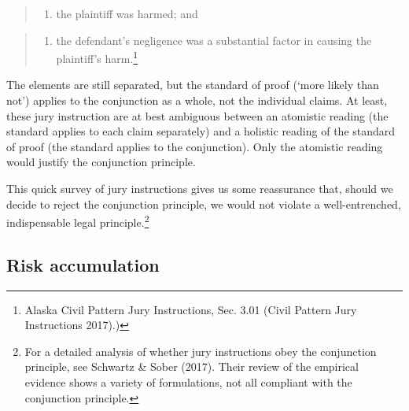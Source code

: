 \documentclass[
  10pt,
  dvipsnames,enabledeprecatedfontcommands]{scrartcl}
\providecommand{\tightlist}{%
  \setlength{\itemsep}{0pt}\setlength{\parskip}{0pt}}
\begin{document}
\begin{quote}
\begin{enumerate}
\def\labelenumi{\arabic{enumi}.}
\setcounter{enumi}{1}
\tightlist
\item
  the plaintiff was harmed; and
\end{enumerate}
\end{quote}

\begin{quote}
\begin{enumerate}
\def\labelenumi{\arabic{enumi}.}
\setcounter{enumi}{2}
\tightlist
\item
  the defendant's negligence was a substantial factor in causing the
  plaintiff's harm.\footnote{Alaska Civil Pattern Jury Instructions,
    Sec. 3.01 (Civil Pattern Jury Instructions 2017).)}
\end{enumerate}
\end{quote}

\noindent The elements are still separated, but the standard of proof
(`more likely than not') applies to the conjunction as a whole, not the
individual claims. At least, these jury instruction are at best
ambiguous between an atomistic reading (the standard applies to each
claim separately) and a holistic reading of the standard of proof (the
standard applies to the conjunction). Only the atomistic reading would
justify the conjunction principle.

This quick survey of jury instructions gives us some reassurance that,
should we decide to reject the conjunction principle, we would not
violate a well-entrenched, indispensable legal principle.\footnote{For a
  detailed analysis of whether jury instructions obey the conjunction
  principle, see Schwartz \& Sober (2017). Their review of the empirical
  evidence shows a variety of formulations, not all compliant with the
  conjunction principle.}

\hypertarget{risk-accumulation}{%
\subsection{Risk accumulation}\label{risk-accumulation}}
\end{document}
